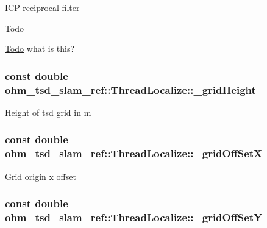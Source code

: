 I\-C\-P reciprocal filter \begin{DoxyRefDesc}{Todo}
\item[\hyperlink{todo__todo000023}{Todo}]what is this? \end{DoxyRefDesc}
\hypertarget{classohm__tsd__slam__ref_1_1ThreadLocalize_af9493e2cbbce37f693bbe632374d0d2a}{
\subsubsection[{\-\_\-grid\-Height}]{\setlength{\rightskip}{0pt plus 5cm}const double ohm\-\_\-tsd\-\_\-slam\-\_\-ref\-::\-Thread\-Localize\-::\-\_\-grid\-Height\hspace{0.3cm}{\ttfamily [private]}}}\label{classohm__tsd__slam__ref_1_1ThreadLocalize_af9493e2cbbce37f693bbe632374d0d2a}
Height of tsd grid in m \hypertarget{classohm__tsd__slam__ref_1_1ThreadLocalize_a74254a193f989fd948778e780a340b9c}{
\subsubsection[{\-\_\-grid\-Off\-Set\-X}]{\setlength{\rightskip}{0pt plus 5cm}const double ohm\-\_\-tsd\-\_\-slam\-\_\-ref\-::\-Thread\-Localize\-::\-\_\-grid\-Off\-Set\-X\hspace{0.3cm}{\ttfamily [private]}}}\label{classohm__tsd__slam__ref_1_1ThreadLocalize_a74254a193f989fd948778e780a340b9c}
Grid origin x offset \hypertarget{classohm__tsd__slam__ref_1_1ThreadLocalize_ab12390e3a1727f9d1c47fc96747bd96c}{
\subsubsection[{\-\_\-grid\-Off\-Set\-Y}]{\setlength{\rightskip}{0pt plus 5cm}const double ohm\-\_\-tsd\-\_\-slam\-\_\-ref\-::\-Thread\-Localize\-::\-\_\-grid\-Off\-Set\-Y\hspace{0.3cm}{\ttfamily [private]}}}\label{classohm__tsd__slam__ref_1_1ThreadLocalize_ab12390e3a1727f9d1c47fc96747bd96c}
